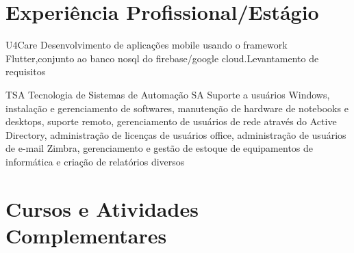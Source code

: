 \documentclass[letterpaper]{moderncurriculum} %
\begin{document}
\section{Experiência Profissional/Estágio}
\begin{biglist} %
    \space    
	{U4Care}%
	{}%
	{Desenvolvimento de aplicações mobile usando o framework Flutter,conjunto ao banco nosql do firebase/google cloud.Levantamento de requisitos  }
\end{biglist}
\begin{biglist} %
    \space    
	{TSA Tecnologia de Sistemas de Automação SA}%
	{}%
	{Suporte a usuários Windows, instalação e gerenciamento de softwares, manutenção de hardware de notebooks e desktops, suporte remoto, gerenciamento de usuários de rede através do Active Directory, administração de licenças de usuários office, administração de usuários de e-mail Zimbra, gerenciamento e gestão de estoque de equipamentos de informática e criação de relatórios diversos}
\end{biglist}

\section{Cursos e Atividades Complementares}
\begin{shortlist} %

 \end{shortlist}






\end{document}

